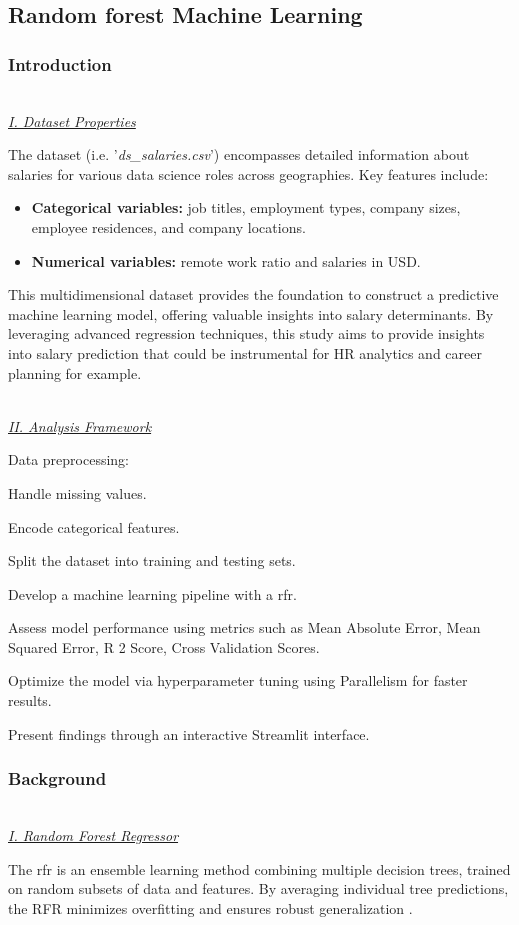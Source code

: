 \documentclass[11pt,a4paper]{article}
\newcommand{\SubItem}[1]{
  {\setlength\itemindent{13pt} \item[◦] #1}
}
\newcommand{\subsubsubsection}[1]{
  {\setlength\itemindent{13pt} \textit{\uline{\\#1\\}}} 
}
\begin{document}
\subsection{Random forest Machine Learning}
\subsubsection{Introduction}
\subsubsubsection{I. Dataset Properties}
The dataset (i.e. '\textit{ds\_salaries.csv}') \cite{Kaggle} encompasses detailed information about salaries for various data science roles across geographies. Key features include:

\begin{itemize}
\item \textbf{Categorical variables:} job titles, employment types, company sizes, employee residences, and company locations.
\item \textbf{Numerical variables:} remote work ratio and salaries in USD.
\end{itemize}

This multidimensional dataset provides the foundation to construct a predictive machine learning model, offering valuable insights into salary determinants. By leveraging advanced regression techniques, this study aims to provide insights into salary prediction that could be instrumental for HR analytics and career planning for example.

\subsubsubsection{II. Analysis Framework}
\begin{itemize}
\item Data preprocessing:
\SubItem{Handle missing values.}
\SubItem{Encode categorical features.}
\SubItem{Split the dataset into training and testing sets.}
\item Develop a machine learning pipeline with a \acrfull{rfr}.
\item Assess model performance using metrics such as Mean Absolute Error, Mean Squared Error, R 2 Score, Cross Validation Scores.
\item Optimize the model via hyperparameter tuning using Parallelism for faster results.
\item Present findings through an interactive Streamlit interface.
\end{itemize}

\subsubsection{Background}
\subsubsubsection{I. Random Forest Regressor}
\newline
The \acrshort{rfr} is an ensemble learning method combining multiple decision trees, trained on random subsets of data and features. By averaging individual tree predictions, the RFR minimizes overfitting and ensures robust generalization \cite{breiman:forests}.
\end{document}
